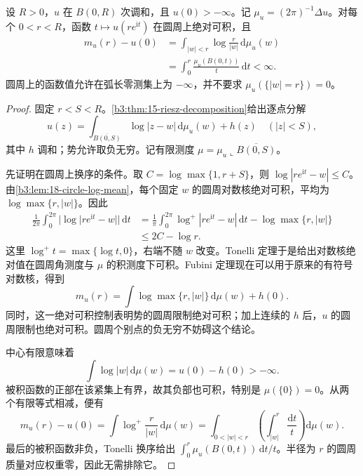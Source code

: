 \begin{theorem}\label{b3:thm:18-subharmonic-jensen}
设 \(R>0\)，\(u\) 在 \(B(0,R)\) 次调和，且 \(u(0)>-\infty\)。记 \(\mu_u=(2\pi)^{-1}\Delta u\)。对每个 \(0<r<R\)，函数 \(t\mapsto u(re^{\mathrm it})\) 在圆周上绝对可积，且
\begin{equation}\label{b3:eq:18-subharmonic-jensen}
 \begin{aligned}
 m_u(r)-u(0)
 &=\int_{|w|<r}\log\frac r{|w|}\,\mathrm d\mu_u(w)\\
 &=\int_0^r\frac{\mu_u(B(0,t))}{t}\,\mathrm dt<\infty.
 \end{aligned}
\end{equation}
圆周上的函数值允许在弧长零测集上为 \(-\infty\)，并不要求 \(\mu_u(\{|w|=r\})=0\)。
\end{theorem}
\begin{proof}
固定 \(r<S<R\)。\cref{b3:thm:15-riesz-decomposition}给出逐点分解
\[
 u(z)=\int_{\overline{B(0,S)}}\log|z-w|\,\mathrm d\mu_u(w)+h(z)
 \quad(|z|<S),
\]
其中 \(h\) 调和；势允许取负无穷。记有限测度 \(\mu=\mu_u\llcorner\overline{B(0,S)}\)。

先证明在圆周上换序的条件。取 \(C=\log\max\{1,r+S\}\)，则 \(\log|re^{\mathrm it}-w|\le C\)。由\cref{b3:lem:18-circle-log-mean}，每个固定 \(w\) 的圆周对数核绝对可积，平均为 \(\log\max\{r,|w|\}\)。因此
\[
 \begin{aligned}
 \frac1{2\pi}\int_0^{2\pi}|\log|re^{\mathrm it}-w||\,\mathrm dt
 &=\frac1\pi\int_0^{2\pi}\log^+|re^{\mathrm it}-w|\,\mathrm dt
   -\log\max\{r,|w|\}\\
 &\le 2C-\log r.
 \end{aligned}
\]
这里 \(\log^+t=\max\{\log t,0\}\)，右端不随 \(w\) 改变。Tonelli 定理于是给出对数核绝对值在圆周角测度与 \(\mu\) 的积测度下可积。Fubini 定理现在可以用于原来的有符号对数核，得到
\[
 m_u(r)=\int\log\max\{r,|w|\}\,\mathrm d\mu(w)+h(0).
\]
同时，这一绝对可积控制表明势的圆周限制绝对可积；加上连续的 \(h\) 后，\(u\) 的圆周限制也绝对可积。圆周个别点的负无穷不妨碍这个结论。

中心有限意味着
\[
 \int\log|w|\,\mathrm d\mu(w)=u(0)-h(0)>-\infty.
\]
被积函数的正部在该紧集上有界，故其负部也可积，特别是 \(\mu(\{0\})=0\)。从两个有限等式相减，便有
\[
 m_u(r)-u(0)
 =\int\log^+\frac r{|w|}\,\mathrm d\mu(w)
 =\int_{0<|w|<r}\left(\int_{|w|}^r\frac{\mathrm dt}{t}\right)\mathrm d\mu(w).
\]
最后的被积函数非负，Tonelli 换序给出 \(\int_0^r\mu_u(B(0,t))\,\mathrm dt/t\)。半径为 \(r\) 的圆周质量对应权重零，因此无需排除它。
\end{proof}

